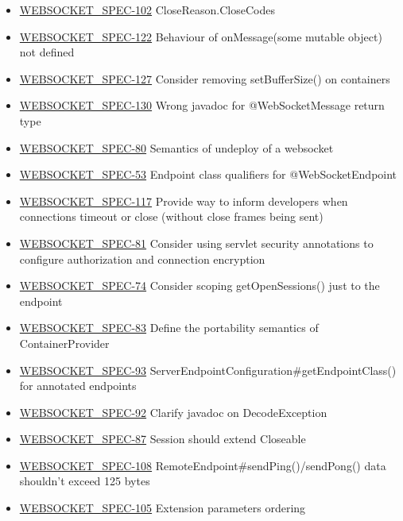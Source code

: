 \begin{itemize}
\item \href {http://java.net/jira/browse/WEBSOCKET_SPEC-102}{WEBSOCKET\_SPEC-102} CloseReason.CloseCodes
\item \href {http://java.net/jira/browse/WEBSOCKET_SPEC-122}{WEBSOCKET\_SPEC-122} Behaviour of onMessage(some mutable object) not defined
\item \href {http://java.net/jira/browse/WEBSOCKET_SPEC-127}{WEBSOCKET\_SPEC-127} Consider removing setBufferSize() on containers
\item \href {http://java.net/jira/browse/WEBSOCKET_SPEC-130}{WEBSOCKET\_SPEC-130} Wrong javadoc for @WebSocketMessage return type
\item \href {http://java.net/jira/browse/WEBSOCKET_SPEC-80}{WEBSOCKET\_SPEC-80} Semantics of undeploy of a websocket
\item \href {http://java.net/jira/browse/WEBSOCKET_SPEC-53}{WEBSOCKET\_SPEC-53} Endpoint class qualifiers for @WebSocketEndpoint
\item \href {http://java.net/jira/browse/WEBSOCKET_SPEC-117}{WEBSOCKET\_SPEC-117} Provide way to inform developers when connections timeout or close (without close frames being sent)
\item \href {http://java.net/jira/browse/WEBSOCKET_SPEC-81}{WEBSOCKET\_SPEC-81} Consider using servlet security annotations to configure authorization and connection encryption
\item \href {http://java.net/jira/browse/WEBSOCKET_SPEC-74}{WEBSOCKET\_SPEC-74} Consider scoping getOpenSessions() just to the endpoint
\item \href {http://java.net/jira/browse/WEBSOCKET_SPEC-83}{WEBSOCKET\_SPEC-83} Define the portability semantics of ContainerProvider
\item \href {http://java.net/jira/browse/WEBSOCKET_SPEC-93}{WEBSOCKET\_SPEC-93} ServerEndpointConfiguration\#getEndpointClass() for annotated endpoints
\item \href {http://java.net/jira/browse/WEBSOCKET_SPEC-92}{WEBSOCKET\_SPEC-92} Clarify javadoc on DecodeException
\item \href {http://java.net/jira/browse/WEBSOCKET_SPEC-87}{WEBSOCKET\_SPEC-87} Session should extend Closeable
\item \href {http://java.net/jira/browse/WEBSOCKET_SPEC-108}{WEBSOCKET\_SPEC-108} RemoteEndpoint\#sendPing()/sendPong() data shouldn't exceed 125 bytes
\item \href {http://java.net/jira/browse/WEBSOCKET_SPEC-105}{WEBSOCKET\_SPEC-105} Extension parameters ordering

\end{itemize}
